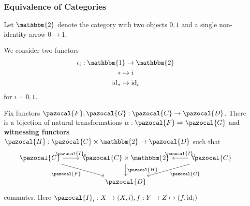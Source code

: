 \subsubsection{Equivalence of Categories}
    \begin{definition}
        Let $\mathbbm{2}$ denote the category with two objects $0,1$ and a single non-identity arrow $0\rightarrow 1$. 
    \end{definition}
    We consider two functors 
    \begin{gather*}
        \iota_i : \mathbbm{1}\rightarrow \mathbbm{2}\\
        \ast \mapsto i\\
        \id_\ast \mapsto \id_i 
    \end{gather*}
    for $i=0,1$. 
    \begin{lemma}
        Fix functors $\pazocal{F},\pazocal{G}:\pazocal{C}\rightarrow \pazocal{D}$. There is a bijection of natural transformations $\alpha: \pazocal{F} \Rightarrow \pazocal{G}$ and \textbf{witnessing functors} $\pazocal{H}:\pazocal{C}\times \mathbbm{2}\rightarrow \pazocal{D}$ such that 
        $$
            \begin{tikzcd}
                \pazocal{C} \arrow[r,"\pazocal{I}_0"]\arrow[rd,"\pazocal{F}",swap] & \pazocal{C}\times \mathbbm{2} \arrow[d,"\pazocal{H}"] & \pazocal{C}\arrow[ld,"\pazocal{G}"]\arrow[l,"\pazocal{I}_1",swap]\\
                & \pazocal{D}
            \end{tikzcd}
        $$
        commutes. Here $\pazocal{I}_i: X\mapsto (X,i), f:Y\rightarrow Z\mapsto (f,\id_i)$
    \end{lemma}
